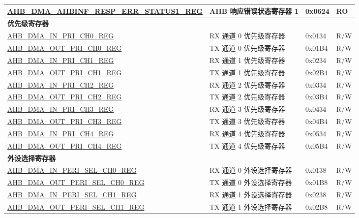 \begin{longtable}{ | l | l | p{1.3cm} | l | }
\hyperref[regdesc:AHBDMAAHBINFRESPERRSTATUS1REG]{AHB\_DMA\_AHBINF\_RESP\_ERR\_STATUS1\_REG} & AHB 响应错误状态寄存器 1 & 0x0624 & RO    \\ \hline
\multicolumn{4}{|l|}{\textbf{优先级寄存器}} \\ \hline
\hyperref[regdesc:AHBDMAINPRICHNREG]{AHB\_DMA\_IN\_PRI\_CH0\_REG} & RX 通道 0 优先级寄存器 & 0x0134 & R/W    \\ \hline
\hyperref[regdesc:AHBDMAOUTPRICHNREG]{AHB\_DMA\_OUT\_PRI\_CH0\_REG} & TX 通道 0 优先级寄存器 & 0x01B4 & R/W    \\ \hline
\hyperref[regdesc:AHBDMAINPRICHNREG]{AHB\_DMA\_IN\_PRI\_CH1\_REG} & RX 通道 1 优先级寄存器 & 0x0234 & R/W    \\ \hline
\hyperref[regdesc:AHBDMAOUTPRICHNREG]{AHB\_DMA\_OUT\_PRI\_CH1\_REG} & TX 通道 1 优先级寄存器 & 0x02B4 & R/W    \\ \hline
\hyperref[regdesc:AHBDMAINPRICHNREG]{AHB\_DMA\_IN\_PRI\_CH2\_REG} & RX 通道 2 优先级寄存器 & 0x0334 & R/W    \\ \hline
\hyperref[regdesc:AHBDMAOUTPRICHNREG]{AHB\_DMA\_OUT\_PRI\_CH2\_REG} & TX 通道 2 优先级寄存器 & 0x03B4 & R/W    \\ \hline
\hyperref[regdesc:AHBDMAINPRICHNREG]{AHB\_DMA\_IN\_PRI\_CH3\_REG} & RX 通道 3 优先级寄存器 & 0x0434 & R/W    \\ \hline
\hyperref[regdesc:AHBDMAOUTPRICHNREG]{AHB\_DMA\_OUT\_PRI\_CH3\_REG} & TX 通道 3 优先级寄存器 & 0x04B4 & R/W    \\ \hline
\hyperref[regdesc:AHBDMAINPRICHNREG]{AHB\_DMA\_IN\_PRI\_CH4\_REG} & RX 通道 4 优先级寄存器 & 0x0534 & R/W    \\ \hline
\hyperref[regdesc:AHBDMAOUTPRICHNREG]{AHB\_DMA\_OUT\_PRI\_CH4\_REG} & TX 通道 4 优先级寄存器 & 0x05B4 & R/W    \\ \hline
\multicolumn{4}{|l|}{\textbf{外设选择寄存器}} \\ \hline
\hyperref[regdesc:AHBDMAINPERISELCHNREG]{AHB\_DMA\_IN\_PERI\_SEL\_CH0\_REG} & RX 通道 0 外设选择寄存器 & 0x0138 & R/W \\ \hline
\hyperref[regdesc:AHBDMAOUTPERISELCHNREG]{AHB\_DMA\_OUT\_PERI\_SEL\_CH0\_REG} & TX 通道 0 外设选择寄存器 & 0x01B8 & R/W    \\ \hline
\hyperref[regdesc:AHBDMAINPERISELCHNREG]{AHB\_DMA\_IN\_PERI\_SEL\_CH1\_REG} & RX 通道 1 外设选择寄存器 & 0x0238 & R/W    \\ \hline
\hyperref[regdesc:AHBDMAOUTPERISELCHNREG]{AHB\_DMA\_OUT\_PERI\_SEL\_CH1\_REG} & TX 通道 1 外设选择寄存器 & 0x02B8 & R/W    \\ \hline

\end{longtable}
